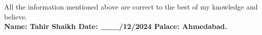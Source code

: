 \prefix{}
\begin{rubric}{}
{ All the information mentioned above are correct to the best of my knowledge and believe.}\\
\textbf{Name: Tahir Shaikh \hspace*{3cm}Date: \_\_\_/12/2024 \hspace*{2.5cm}Palace: Ahmedabad.}
\end{rubric}


